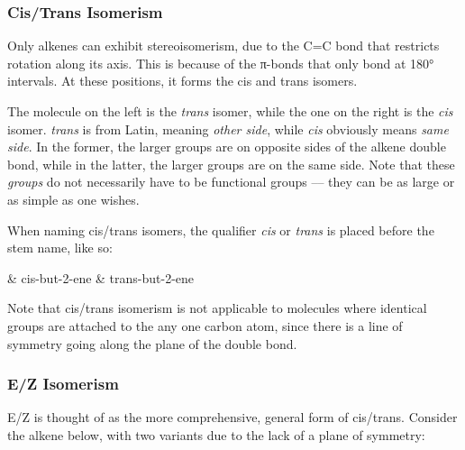 	\subsubsection{Cis/Trans Isomerism}

		Only alkenes can exhibit stereoisomerism, due to the C=C bond that restricts rotation along its axis. This is because of the
		π-bonds that only bond at 180° intervals. At these positions, it forms the cis and trans isomers.


		The molecule on the left is the \textit{trans} isomer, while the one on the right is the \textit{cis} isomer. \textit{trans}
		is from Latin, meaning \textit{other side}, while \textit{cis} obviously means \textit{same side}. In the former,
		the larger groups are on opposite sides of the alkene double bond, while in the latter, the larger groups are on the same
		side. Note that these \textit{groups} do not necessarily have to be functional groups –– they can be as large or as simple
		as one wishes.

		When naming cis/trans isomers, the qualifier \textit{cis} or \textit{trans} is placed before the stem name, like so:
		\begin{bulletlist}
			& cis-but-2-ene
			& trans-but-2-ene
		\end{bulletlist}

		Note that cis/trans isomerism is not applicable to molecules where identical groups are attached to the any one carbon atom,
		since there is a line of symmetry going along the plane of the double bond.






	\pagebreak

	\subsubsection{E/Z Isomerism}

		E/Z is thought of as the more comprehensive, general form of cis/trans. Consider the alkene below, with two variants
		due to the lack of a plane of symmetry:

